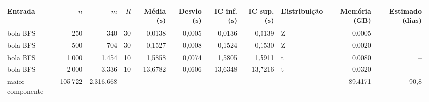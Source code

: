 \begin{tabular}{lrrrrrrrlrr}
\toprule
Entrada & $n$ & $m$ & $R$ & Média (s) & Desvio (s) & IC inf. (s) & IC sup. (s) & Distribuição & Memória (GB) & Estimado (dias) \\
\midrule
bola BFS & 250 & 340 & 30 & 0,0138 & 0,0005 & 0,0136 & 0,0139 & Z & 0,0005 & -- \\
bola BFS & 500 & 704 & 30 & 0,1527 & 0,0008 & 0,1524 & 0,1530 & Z & 0,0020 & -- \\
bola BFS & 1.000 & 1.454 & 10 & 1,5858 & 0,0074 & 1,5805 & 1,5911 & t & 0,0080 & -- \\
bola BFS & 2.000 & 3.336 & 10 & 13,6782 & 0,0606 & 13,6348 & 13,7216 & t & 0,0320 & -- \\
maior componente & 105.722 & 2.316.668 & -- & -- & -- & -- & -- & -- & 89,4171 & 90,8 \\
\bottomrule
\end{tabular}
